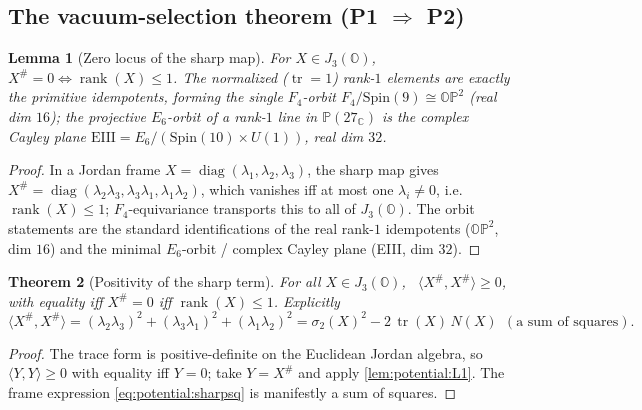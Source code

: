 \documentclass[11pt]{article}
\theoremstyle{plain}
\newtheorem{theorem}{Theorem}[section]
\newtheorem{lemma}[theorem]{Lemma}
\theoremstyle{definition}
\theoremstyle{remark}
\begin{document}
\subsection{The vacuum-selection theorem (P1 \texorpdfstring{$\Rightarrow$}{=>} P2)}
\label{sec:potential:theorem}

\begin{lemma}[Zero locus of the sharp map]
\label{lem:potential:L1}
\label{thm:potential:L1}
For $X\in J_3(\mathbb O)$, \ $X^\#=0\iff\operatorname{rank}(X)\le1$. The normalized
($\operatorname{tr}=1$) rank-$1$ elements are exactly the primitive idempotents, forming the
single $F_4$-orbit $F_4/\mathrm{Spin}(9)\cong\mathbb{OP}^2$ (real dim $16$); the
projective $E_6$-orbit of a rank-$1$ line in $\mathbb P(27_{\mathbb C})$ is the complex
Cayley plane $\mathrm{EIII}=E_6/(\mathrm{Spin}(10)\times U(1))$, real dim $32$.
\end{lemma}

\begin{proof}
In a Jordan frame $X=\operatorname{diag}(\lambda_1,\lambda_2,\lambda_3)$, the sharp map gives
$X^\#=\operatorname{diag}(\lambda_2\lambda_3,\lambda_3\lambda_1,\lambda_1\lambda_2)$, which
vanishes iff at most one $\lambda_i\neq0$, i.e. $\operatorname{rank}(X)\le1$; $F_4$-equivariance
transports this to all of $J_3(\mathbb O)$. The orbit statements are the standard
identifications of the real rank-$1$ idempotents ($\mathbb{OP}^2$, dim $16$) and the minimal
$E_6$-orbit / complex Cayley plane (EIII, dim $32$).
\end{proof}

\begin{theorem}[Positivity of the sharp term]
\label{thm:potential:T1}
For all $X\in J_3(\mathbb O)$, \ $\langle X^\#,X^\#\rangle\ge0$, with equality iff $X^\#=0$
iff $\operatorname{rank}(X)\le1$. Explicitly
\begin{equation}
\label{eq:potential:sharpsq}
\langle X^\#,X^\#\rangle=(\lambda_2\lambda_3)^2+(\lambda_3\lambda_1)^2+(\lambda_1\lambda_2)^2
=\sigma_2(X)^2-2\,\operatorname{tr}(X)\,N(X)\ \ (\text{a sum of squares}).
\end{equation}
\end{theorem}

\begin{proof}
The trace form is positive-definite on the Euclidean Jordan algebra, so $\langle Y,Y\rangle\ge0$
with equality iff $Y=0$; take $Y=X^\#$ and apply \autoref{lem:potential:L1}. The frame
expression \eqref{eq:potential:sharpsq} is manifestly a sum of squares.
\end{proof}
\end{document}

